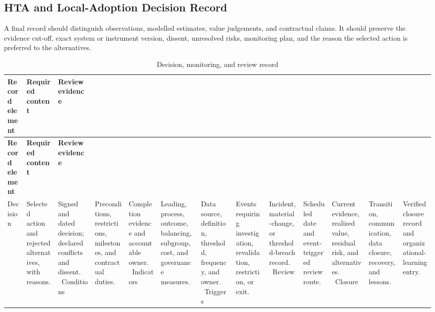 \subsection{HTA and Local-Adoption Decision Record}
\label{sec:comp-ch07-supp-3}
A final record should distinguish observations, modelled estimates, value
judgements, and contractual claims. It should preserve the evidence cut-off, exact
system or instrument version, dissent, unresolved risks, monitoring plan, and the
reason the selected action is preferred to the alternatives.

\begin{longtable}{@{}p{}p{}p{}@{}}
\caption{Decision, monitoring, and review record}
\label{tab:comp-ch07-decision-record}\\
\toprule
\textbf{Record element} & \textbf{Required content} & \textbf{Review evidence} \\
\midrule
\endfirsthead
\toprule
\textbf{Record element} & \textbf{Required content} & \textbf{Review evidence} \\
\midrule
\endhead
\bottomrule
\endlastfoot
Decision & Selected action and rejected alternatives, with reasons. & Signed and dated decision; declared conflicts and dissent. \
Conditions & Preconditions, restrictions, milestones, and contractual duties. & Completion evidence and accountable owner. \
Indicators & Leading, process, outcome, balancing, subgroup, cost, and governance measures. & Data source, definition, threshold, frequency, and owner. \
Triggers & Events requiring investigation, revalidation, restriction, or exit. & Incident, material-change, or threshold-breach record. \
Review & Scheduled date and event-triggered review route. & Current evidence, realized value, residual risk, and alternatives. \
Closure & Transition, communication, data closure, recovery, and lessons. & Verified closure record and organizational-learning entry. \
\end{longtable}

